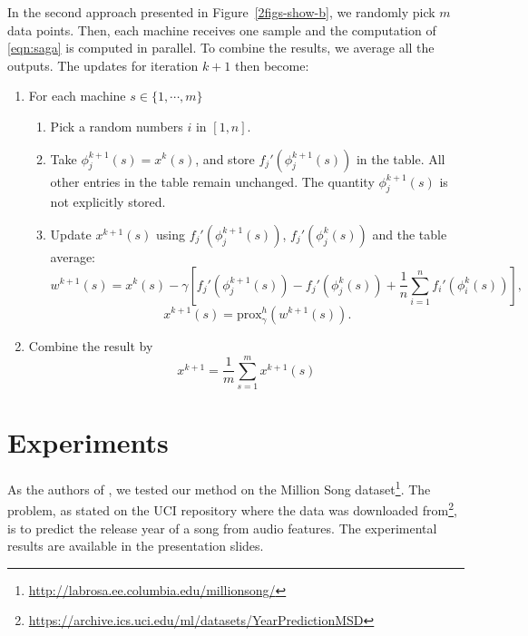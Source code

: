 \documentclass[a4paper,11pt]{article}
\newcommand{\prox}{\textrm{prox}}
\begin{document}
In the second approach presented in Figure~\ref{2figs-show-b}, we randomly pick $m$ data points. Then, each machine receives one sample and the computation of \eqref{eqn:saga} is computed in parallel. To combine the results, we average all the outputs. The updates for iteration $k+1$ then become:
\begin{enumerate}	
	\item For each machine $s \in \{ 1, \cdots, m \}$
	\begin{enumerate}
		\item Pick a random numbers $i$ in $[1, n]$.
		\item Take $\phi_j^{k+1}(s) = x^k(s)$, and store $f_j'(\phi_j^{k+1}(s))$ in the table.
		All other entries in the table remain unchanged. The quantity $\phi_j^{k+1}(s)$
		is not explicitly stored.
		\item Update $x^{k+1}(s)$ using $f_j'(\phi_j^{k+1}(s))$, $f_j'(\phi_j^k(s))$ and the table
		average:
		\begin{equation}
		w^{k+1}(s) = x^k(s) - \gamma \left[ f_j'(\phi_j^{k+1}(s)) - f_j'(\phi_j^k(s))
		+ \frac1n \sum_{i=1}^n f_i'(\phi_i^k(s)) \right] ,
		\end{equation}
		$$x^{k+1}(s) = \prox_\gamma^h (w^{k+1}(s)).$$
	\end{enumerate}
	\item Combine the result by
	$$ x^{k+1} = \frac{1}{m} \sum_{s=1}^m x^{k+1}(s) $$
\end{enumerate}

\section{Experiments}
As the authors of \cite{defazio_saga_2014}, we tested our method on the Million
Song dataset\footnote{\url{http://labrosa.ee.columbia.edu/millionsong/}}. The
problem, as stated on the UCI repository where the data was downloaded
from\footnote{\url{https://archive.ics.uci.edu/ml/datasets/YearPredictionMSD}},
is to predict the release year of a song from audio features. The experimental results are available in the presentation slides.

%

\printbibliography
\end{document}
